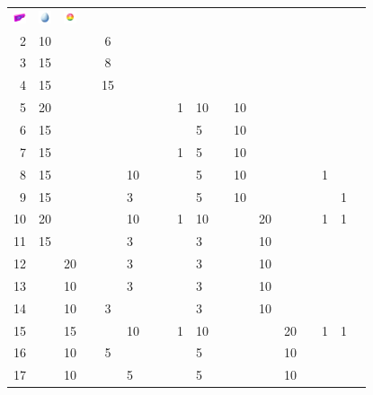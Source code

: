 \begin{table}[t]
\begin{center}
\begin{tabular}{r|g c g c g c g c g c g c g c g c g}
  \includegraphics[width=1em]{images/lure.png} &
  \includegraphics[width=1em]{images/luckyegg.png} &
  \includegraphics[width=1em]{images/rarecandy.png}
    \\
    2 & 10 &    &    &  6 &    &    &    &   &    &    &    &    &    &    &   &   & \\
    3 & 15 &    &    &  8 &    &    &    &   &    &    &    &    &    &    &   &   & \\
    4 & 15 &    &    & 15 &    &    &    &   &    &    &    &    &    &    &   &   & \\
    5 & 20 &    &    &    &    &    &    & 1 & 10 &    & 10 &    &    &    &   &   & \\
    6 & 15 &    &    &    &    &    &    &   &  5 &    & 10 &    &    &    &   &   & \\
    7 & 15 &    &    &    &    &    &    & 1 &  5 &    & 10 &    &    &    &   &   & \\
    8 & 15 &    &    &    & 10 &    &    &   &  5 &    & 10 &    &    &    & 1 &   & \\
    9 & 15 &    &    &    &  3 &    &    &   &  5 &    & 10 &    &    &    &   & 1 & \\
   10 & 20 &    &    &    & 10 &    &    & 1 & 10 &    &    & 20 &    &    & 1 & 1 & \\
   11 & 15 &    &    &    &  3 &    &    &   &  3 &    &    & 10 &    &    &   &   & \\
   12 &    & 20 &    &    &  3 &    &    &   &  3 &    &    & 10 &    &    &   &   & \\
   13 &    & 10 &    &    &  3 &    &    &   &  3 &    &    & 10 &    &    &   &   & \\
   14 &    & 10 &    &  3 &    &    &    &   &  3 &    &    & 10 &    &    &   &   & \\
   15 &    & 15 &    &    & 10 &    &    & 1 & 10 &    &    &    & 20 &    & 1 & 1 & \\
   16 &    & 10 &    &  5 &    &    &    &   &  5 &    &    &    & 10 &    &   &   & \\
   17 &    & 10 &    &    &  5 &    &    &   &  5 &    &    &    & 10 &    &   &   & \\

\end{tabular}
\end{center}
\end{table}
